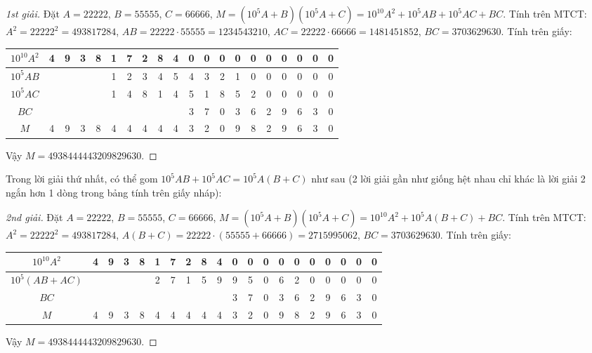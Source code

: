 \documentclass{article}
\begin{document}
\begin{proof}[1st giải]
	Đặt $A = 22222$, $B = 55555$, $C = 66666$, $M = (10^5A + B)(10^5A + C) = 10^{10}A^2 + 10^5AB + 10^5AC + BC$. Tính trên MTCT: $A^2 = 22222^2 = 493817284$, $AB = 22222\cdot55555 = 1234543210$, $AC = 22222\cdot66666 = 1481451852$, $BC = 3703629630$. Tính trên giấy:
	\begin{table}[H]
		\centering
		\begin{tabular}{|c|c|c|c|c|c|c|c|c|c|c|c|c|c|c|c|c|c|c|c|}
			\hline
			$10^{10}A^2$ & 4 & 9 & 3 & 8 & 1 & 7 & 2 & 8 & 4 & 0 & 0 & 0 & 0 & 0 & 0 & 0 & 0 & 0 & 0 \\
			\hline
			$10^5AB$ &  &  &  &  & 1 & 2 & 3 & 4 & 5 & 4 & 3 & 2 & 1 & 0 & 0 & 0 & 0 & 0 & 0 \\
			\hline
			$10^5AC$ &  &  &  &  & 1 & 4 & 8 & 1 & 4 & 5 & 1 & 8 & 5 & 2 & 0 & 0 & 0 & 0 & 0 \\
			\hline
			$BC$ &  &  &  &  &  &  &  &  &  & 3 & 7 & 0 & 3 & 6 & 2 & 9 & 6 & 3 & 0 \\
			\hline
			$M$ & 4 & 9 & 3 & 8 & 4 & 4 & 4 & 4 & 4 & 3 & 2 & 0 & 9 & 8 & 2 & 9 & 6 & 3 & 0 \\
			\hline
		\end{tabular}
	\end{table}
	\noindent Vậy $M = 4938444443209829630$.
\end{proof}
Trong lời giải thứ nhất, có thể gom $10^5AB + 10^5AC = 10^5A(B + C)$ như sau (2 lời giải gần như giống hệt nhau chỉ khác là lời giải 2 ngắn hơn 1 dòng trong bảng tính trên giấy nháp):

\begin{proof}[2nd giải]
	Đặt $A = 22222$, $B = 55555$, $C = 66666$, $M = (10^5A + B)(10^5A + C) = 10^{10}A^2 + 10^5A(B + C) + BC$. Tính trên MTCT: $A^2 = 22222^2 = 493817284$, $A(B + C) = 22222\cdot(55555 + 66666) = 2715995062$, $BC = 3703629630$. Tính trên giấy:
	\begin{table}[H]
		\centering
		\begin{tabular}{|c|c|c|c|c|c|c|c|c|c|c|c|c|c|c|c|c|c|c|c|}
			\hline
			$10^{10}A^2$ & 4 & 9 & 3 & 8 & 1 & 7 & 2 & 8 & 4 & 0 & 0 & 0 & 0 & 0 & 0 & 0 & 0 & 0 & 0 \\
			\hline
			$10^5(AB + AC)$ &  &  &  &  & 2 & 7 & 1 & 5 & 9 & 9 & 5 & 0 & 6 & 2 & 0 & 0 & 0 & 0 & 0 \\
			\hline
			$BC$ &  &  &  &  &  &  &  &  &  & 3 & 7 & 0 & 3 & 6 & 2 & 9 & 6 & 3 & 0 \\
			\hline
			$M$ & 4 & 9 & 3 & 8 & 4 & 4 & 4 & 4 & 4 & 3 & 2 & 0 & 9 & 8 & 2 & 9 & 6 & 3 & 0 \\
			\hline
		\end{tabular}
	\end{table}
	\noindent Vậy $M = 4938444443209829630$.
\end{proof}
\end{document}
